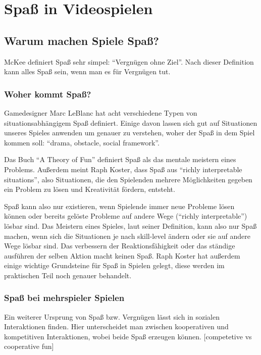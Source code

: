 \chapter{Spaß in Videospielen}

\section{Warum machen Spiele Spaß?}

McKee definiert Spaß sehr simpel: "`Vergnügen ohne Ziel"'. Nach dieser Definition kann alles Spaß sein, wenn man es für Vergnügen tut.

\subsection{Woher kommt Spaß?}

Gamedesigner Marc LeBlanc hat acht verschiedene Typen von situationsabhängigem Spaß definiert. Einige davon lassen sich gut auf Situationen unseres Spieles anwenden um genauer zu verstehen, woher der Spaß in dem Spiel kommen soll: "`drama, obstacle, social framework"'. 

Das Buch "`A Theory of Fun"'\cite{_theory_of_fun} definiert Spaß als das mentale meistern eines Problems\cite[S. 71]{_theory_of_fun}. Außerdem meint Raph Koster, dass Spaß aus "`richly interpretable situations"'\cite[S. 40]{_theory_of_fun}, also Situationen, die den Spielenden mehrere Möglichkeiten gegeben ein Problem zu lösen und Kreativität fördern, entsteht. 

Spaß kann also nur existieren, wenn Spielende immer neue Probleme lösen können oder bereits gelöste Probleme auf andere Wege ("`richly interpretable"') lösbar sind. Das Meistern eines Spieles, laut seiner Definition, kann also nur Spaß machen, wenn sich die Situationen je nach skill-level ändern oder sie auf andere Wege lösbar sind. Das verbessern der Reaktionsfähigkeit oder das ständige ausführen der selben Aktion macht keinen Spaß. Raph Koster hat außerdem einige wichtige Grundsteine für Spaß in Spielen gelegt, diese werden im praktischen Teil noch genauer behandelt.

\subsection{Spaß bei mehrspieler Spielen}

Ein weiterer Ursprung von Spaß bzw. Vergnügen lässt sich in sozialen Interaktionen finden\cite[S. 72]{_theory_of_fun}. Hier unterscheidet man zwischen kooperativen und kompetitiven Interaktionen, wobei beide Spaß erzeugen können. 
[competetive vs cooperative fun]

